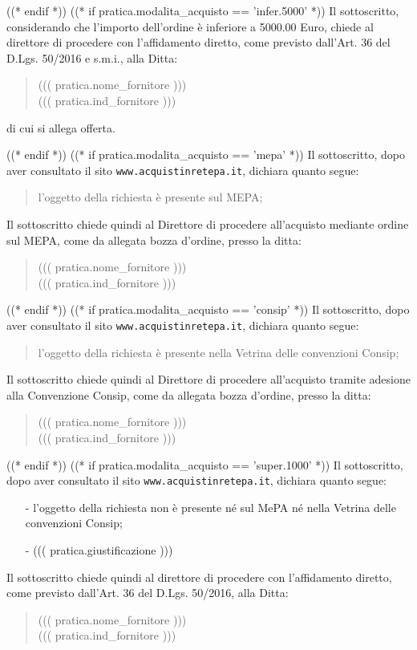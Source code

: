 \documentclass[a4paper,12pt]{letter}
\begin{document}
((* endif *))
((* if pratica.modalita_acquisto == 'infer.5000' *))
Il sottoscritto, considerando che l'importo dell'ordine
\`e inferiore a 5000.00 Euro,
chiede al direttore di procedere con l'affidamento diretto,
come previsto dall'Art. 36 del D.Lgs. 50/2016 e s.m.i., alla Ditta: 
\begin{quote}
((( pratica.nome_fornitore )))\\
((( pratica.ind_fornitore )))
\end{quote}

di cui si allega offerta.

((* endif *))
((* if pratica.modalita_acquisto == 'mepa' *))
Il sottoscritto, dopo aver consultato il sito {\tt www.acquistinretepa.it},
dichiara quanto segue:
\begin{quote}
l'oggetto della richiesta \`e presente sul MEPA;
\end{quote}

Il sottoscritto chiede quindi al Direttore di procedere all'acquisto mediante ordine sul MEPA,
come da allegata bozza d'ordine, presso la ditta:
\begin{quote}
((( pratica.nome_fornitore )))\\
((( pratica.ind_fornitore )))
\end{quote}
((* endif *))
((* if pratica.modalita_acquisto == 'consip' *))
Il sottoscritto, dopo aver consultato il sito {\tt www.acquistinretepa.it},
dichiara quanto segue:
\begin{quote}
l'oggetto della richiesta \`e presente nella Vetrina delle convenzioni Consip;
\end{quote}

Il sottoscritto chiede quindi al Direttore di procedere all'acquisto
tramite adesione alla Convenzione Consip, come da allegata bozza d'ordine,
presso la ditta:
\begin{quote}
((( pratica.nome_fornitore )))\\
((( pratica.ind_fornitore )))
\end{quote}
((* endif *))
((* if pratica.modalita_acquisto == 'super.1000' *)) 
Il sottoscritto, dopo aver consultato il sito {\tt www.acquistinretepa.it},
dichiara quanto segue:

\begin{itemize}
\item[-] l'oggetto della richiesta non \`e presente n\'e sul MePA n\'e nella Vetrina delle convenzioni Consip;
\item[-] ((( pratica.giustificazione )))
\end{itemize}
Il sottoscritto chiede quindi al direttore di procedere con l'affidamento diretto,
come previsto dall'Art. 36 del D.Lgs. 50/2016, alla Ditta: 
\begin{quote}
((( pratica.nome_fornitore )))\\
((( pratica.ind_fornitore )))
\end{quote}
\end{document}
